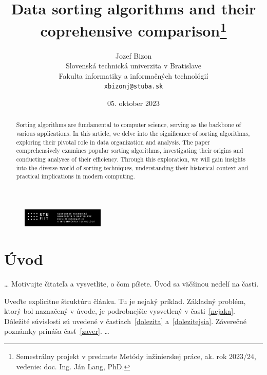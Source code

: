 \documentclass[10pt,twocolumn,twoside,slovak,english,a4paper]{article}
\title{Data sorting algorithms and their coprehensive comparison\thanks{Semestrálny projekt v predmete Metódy inžinierskej práce, ak. rok 2023/24, vedenie: doc. Ing. Ján Lang, PhD. }} %
\author{Jozef Bizon\\[2pt]
	{\small Slovenská technická univerzita v Bratislave}\\
	{\small Fakulta informatiky a informačných technológií}\\
	{\small \texttt{xbizonj@stuba.sk}}
	}
\date{\small 05. oktober 2023
} %
\begin{document}
\maketitle


\begin{abstract}
Sorting algorithms are fundamental to computer science, serving as the backbone of various applications. In this article, we delve into the significance of sorting algorithms, exploring their pivotal role in data organization and analysis. The paper comprehensively examines popular sorting algorithms, investigating their origins and conducting analyses of their efficiency. Through this exploration, we will gain insights into the diverse world of sorting techniques, understanding their historical context and practical implications in modern computing.

\end{abstract}

\begin{figure}
\centering
\includegraphics[width=0.35\textwidth]{fiit_logo}
\end{figure}

\section{Úvod}
\ldots
Motivujte čitateľa a vysvetlite, o čom píšete. Úvod sa väčšinou nedelí na časti.

Uveďte explicitne štruktúru článku. Tu je nejaký príklad.
Základný problém, ktorý bol naznačený v úvode, je podrobnejšie vysvetlený v časti~\ref{nejaka}.
Dôležité súvislosti sú uvedené v častiach~\ref{dolezita} a~\ref{dolezitejsia}.
Záverečné poznámky prináša časť~\ref{zaver}.
\ldots
\end{document}
